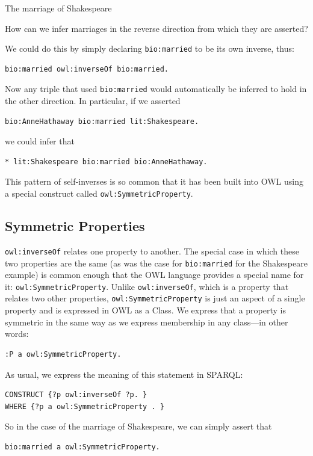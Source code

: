 \begin{challenge}{The marriage of Shakespeare}

How can we infer marriages in the reverse direction from which they are
asserted?

\solution

We could do this by simply declaring \texttt{bio:married} to be its own inverse,
thus:

\begin{lstlisting}
bio:married owl:inverseOf bio:married.
\end{lstlisting}

Now any triple that used \texttt{bio:married} would automatically be inferred to
hold in the other direction. In particular, if we asserted

\begin{lstlisting}
bio:AnneHathaway bio:married lit:Shakespeare.
\end{lstlisting}

we could infer that

\begin{lstlisting}
* lit:Shakespeare bio:married bio:AnneHathaway.
\end{lstlisting}

This pattern of self-inverses is so common that it has been built into
OWL using a special construct called
\texttt{owl:SymmetricProperty}.

\subsection{Symmetric Properties}

\texttt{owl:inverseOf} relates one property to another. The special case in which
these two properties are the same (as was the case for \texttt{bio:married} for
the Shakespeare example) is common enough that the OWL language provides
a special name for it: \texttt{owl:SymmetricProperty}. Unlike \texttt{owl:inverseOf},
which is a property that relates two other properties,
\texttt{owl:SymmetricProperty} is just an aspect of a single property and is
expressed in OWL as a Class. We express that a property is symmetric in
the same way as we express membership in any class---in other words:

\begin{lstlisting}
:P a owl:SymmetricProperty.
\end{lstlisting}

As usual, we express the meaning of this statement in SPARQL:

\begin{lstlisting}
CONSTRUCT {?p owl:inverseOf ?p. }
WHERE {?p a owl:SymmetricProperty . }
\end{lstlisting}

So in the case of the marriage of Shakespeare, we can simply assert that

\begin{lstlisting}
bio:married a owl:SymmetricProperty.
\end{lstlisting}
\end{challenge}


